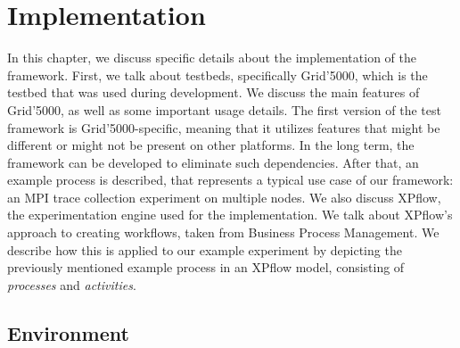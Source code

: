 


\chapter{Implementation}
\label{Chapter4}

In this chapter, we discuss specific details about the implementation
of the framework. First, we talk about testbeds, specifically
Grid'5000, which is the testbed that was used during development. We
discuss the main features of Grid'5000, as well as some important
usage details. The first version of the test framework
is Grid'5000-specific, meaning that it utilizes features that might
be different or might not be present on other platforms. In the long
term, the framework can be developed to eliminate such
dependencies. After that, an example process is described, that
represents a typical use case of our framework: an MPI trace
collection experiment on multiple nodes. We also discuss XPflow, the
experimentation engine
used for the implementation. We talk about XPflow's approach to
creating workflows, taken from Business Process Management. We
describe how this is applied to our example experiment by depicting
the previously mentioned example process in an XPflow model,
consisting of \emph{processes} and \emph{activities}.
\section{Environment}
\label{sec:environment}
